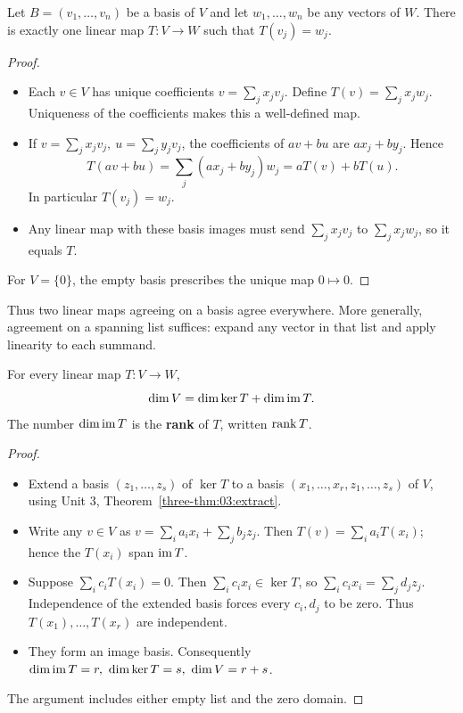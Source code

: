 \begin{theorem}\label{thm:04:prescribed}
Let \(B=(v_1,\ldots,v_n)\) be a basis of \(V\) and let
\(w_1,\ldots,w_n\) be any vectors of \(W\).
There is exactly one linear map \(T:V\to W\) such that \(T(v_j)=w_j\).
\end{theorem}
\begin{proof}
\begin{itemize}
\item Each \(v\in V\) has unique coefficients \(v=\sum_jx_jv_j\).
  Define \(T(v)=\sum_jx_jw_j\). Uniqueness of the coefficients makes
  this a well-defined map.
\item If \(v=\sum_jx_jv_j,\ u=\sum_jy_jv_j\), the coefficients of
  \(av+bu\) are \(ax_j+by_j\). Hence
  \[
  T(av+bu)=\sum_j(ax_j+by_j)w_j=aT(v)+bT(u).
  \]
  In particular \(T(v_j)=w_j\).
\item Any linear map with these basis images must send
  \(\sum_jx_jv_j\) to \(\sum_jx_jw_j\), so it equals \(T\).
\end{itemize}
For \(V=\{0\}\), the empty basis prescribes the unique map \(0\mapsto0\).
\end{proof}

Thus two linear maps agreeing on a basis
agree everywhere. More generally, agreement on a spanning list suffices:
expand any vector in that list and apply linearity to each summand.

\begin{theorem}\label{thm:04:nullity}
For every linear map \(T:V\to W\),
\[
\dim V=\dim\ker T+\dim\operatorname{im} T.
\]
The number \(\dim\operatorname{im} T\) is the \textbf{rank} of \(T\), written \(\operatorname{rank} T\).
\end{theorem}
\begin{proof}
\begin{itemize}
\item Extend a basis \((z_1,\ldots,z_s)\) of \(\ker T\) to a basis
  \((x_1,\ldots,x_r,z_1,\ldots,z_s)\) of \(V\), using Unit 3,
  Theorem~\ref{three-thm:03:extract}.
\item Write any \(v\in V\) as
  \(v=\sum_i a_ix_i+\sum_jb_jz_j\). Then
  \(T(v)=\sum_i a_iT(x_i)\); hence the \(T(x_i)\) span \(\operatorname{im} T\).
\item Suppose \(\sum_i c_iT(x_i)=0\). Then
  \(\sum_i c_ix_i\in\ker T\), so \(\sum_i c_ix_i=\sum_jd_jz_j\).
  Independence of the extended basis forces every \(c_i,d_j\) to be zero.
  Thus \(T(x_1),\ldots,T(x_r)\) are independent.
\item They form an image basis. Consequently
  \(\dim\operatorname{im} T=r,\ \dim\ker T=s,\ \dim V=r+s\).
\end{itemize}
The argument includes either empty list and the zero domain.
\end{proof}

